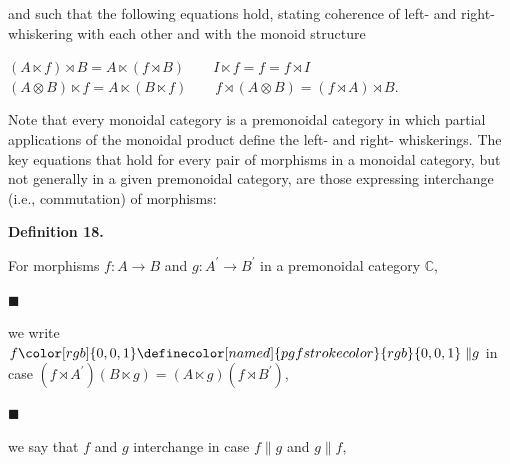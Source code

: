 and such that the following equations hold, stating coherence of left- and right-whiskering with each other and with the monoid structure\par
    $\displaystyle(A\ltimes f)\rtimes B=A\ltimes(f\rtimes B)\qquad I\ltimes f=f=f\rtimes
I$     $\displaystyle(A\otimes B)\ltimes f=A\ltimes(B\ltimes f)\qquad f\rtimes(A\otimes B)=(f\rtimes A)\rtimes B.$    
 
 
\par
 
 
  
 
 
 
Note that every monoidal category is a premonoidal category in which partial applications of the monoidal product define the left- and right- whiskerings. The key equations that hold for every pair of morphisms in a monoidal category, but not generally in a given premonoidal category, are those expressing interchange (i.e., commutation) of morphisms:\par
 
 
 
\par\medskip\noindent\textbf{Definition 18.}\par
 
 
For morphisms $f:A\to B$ and $g:A^{\prime}\to B^{\prime}$ in a premonoidal category $\mathbb{C}$,\par
  
\par\noindent  $\blacksquare$ 
 
we write $f{\color[rgb]{0,0,1}\definecolor[named]{pgfstrokecolor}{rgb}{0,0,1}\parallel}g$ in case $(f\rtimes A^{\prime})(B\ltimes g)=(A\ltimes g)(f\rtimes B^{\prime})$,\par
 
 
 
\par\noindent  $\blacksquare$ 
 
we say that $f$ and $g$ interchange in case $f\parallel g$ and $g\parallel f$,\par
 
 
